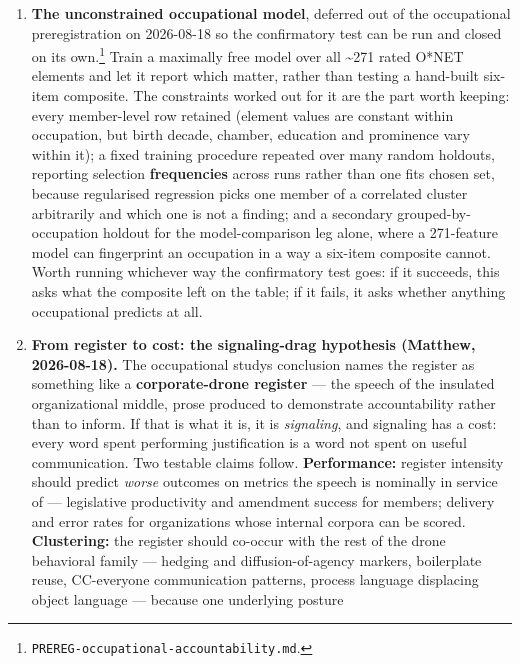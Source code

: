 \begin{enumerate}
\def\labelenumi{\arabic{enumi}.}
\setcounter{enumi}{26}
\item
  \textbf{The unconstrained occupational model}, deferred out of the
  occupational preregistration on 2026-08-18 so the confirmatory
  test can be run and closed on its own.\footnote{\texttt{PREREG-\allowbreak{}occupational-\allowbreak{}accountability.\allowbreak{}md}.} Train a maximally
  free model over all
  \textasciitilde271 rated O*NET elements and let it report which matter, rather than
  testing a hand-built six-item composite. The constraints worked out for it
  are the part worth keeping: every member-level row retained (element values
  are constant within occupation, but birth decade, chamber, education and
  prominence vary within it); a fixed training procedure repeated over many
  random holdouts, reporting selection \textbf{frequencies} across runs rather than
  one fit\textquotesingle s chosen set, because regularised regression picks one member of a
  correlated cluster arbitrarily and which one is not a finding; and a
  secondary grouped-by-occupation holdout for the model-comparison leg alone,
  where a 271-feature model can fingerprint an occupation in a way a six-item
  composite cannot. Worth running whichever way the confirmatory test goes: if
  it succeeds, this asks what the composite left on the table; if it fails, it
  asks whether anything occupational predicts at all.
\item
  \textbf{From register to cost: the signaling-drag hypothesis (Matthew,
  2026-08-18).} The occupational study\textquotesingle s conclusion names the register as
  something like a \textbf{corporate-drone register} --- the speech of the insulated
  organizational middle, prose produced to demonstrate accountability rather
  than to inform. If that is what it is, it is \emph{signaling}, and signaling has
  a cost: every word spent performing justification is a word not spent on
  useful communication. Two testable claims follow. \textbf{Performance:} register
  intensity should predict \emph{worse} outcomes on metrics the speech is
  nominally in service of --- legislative productivity and amendment success
  for members; delivery and error rates for organizations whose internal
  corpora can be scored. \textbf{Clustering:} the register should co-occur with
  the rest of the drone behavioral family --- hedging and diffusion-of-agency
  markers, boilerplate reuse, CC-everyone communication patterns, process
  language displacing object language --- because one underlying posture

\end{enumerate}
